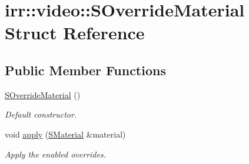 \hypertarget{structirr_1_1video_1_1SOverrideMaterial}{}\section{irr\+:\+:video\+:\+:S\+Override\+Material Struct Reference}
\label{structirr_1_1video_1_1SOverrideMaterial}
\subsection*{Public Member Functions}
\begin{DoxyCompactItemize}
\item 
\hyperlink{structirr_1_1video_1_1SOverrideMaterial_ad9f1deca28bf6efaa302cf736b53cbb7}{S\+Override\+Material} ()\hypertarget{structirr_1_1video_1_1SOverrideMaterial_ad9f1deca28bf6efaa302cf736b53cbb7}{}\label{structirr_1_1video_1_1SOverrideMaterial_ad9f1deca28bf6efaa302cf736b53cbb7}

\begin{DoxyCompactList}\small\item\em Default constructor. \end{DoxyCompactList}\item 
void \hyperlink{structirr_1_1video_1_1SOverrideMaterial_a265ee4ded1529220ca9f1df8acd53a60}{apply} (\hyperlink{classirr_1_1video_1_1SMaterial}{S\+Material} \&material)\hypertarget{structirr_1_1video_1_1SOverrideMaterial_a265ee4ded1529220ca9f1df8acd53a60}{}\label{structirr_1_1video_1_1SOverrideMaterial_a265ee4ded1529220ca9f1df8acd53a60}

\begin{DoxyCompactList}\small\item\em Apply the enabled overrides. \end{DoxyCompactList}\end{DoxyCompactItemize}
